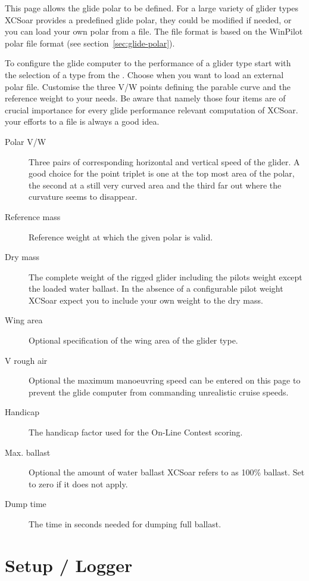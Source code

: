 This page allows the glide polar to be defined. For a large variety of glider types 
XCSoar provides a predefined glide polar, they could be modified if needed, or 
you can load your own polar from a file. 
The file format is based on the WinPilot polar file format (see section~\ref{sec:glide-polar}).

\label{conf:polar} To configure the glide computer to the performance of a glider 
type start with the selection of a type from the . 
Choose  when you want to load an external polar file.
Customise the three V/W points defining the parable curve and the reference 
weight to your needs. 
\tip Be aware that namely those four items are of crucial importance 
for every glide performance relevant computation of XCSoar.   
 your efforts to a file is always a good idea.

\begin{description}
\item[Polar V/W]  Three pairs of corresponding horizontal and vertical speed of the glider. 
  A good choice for the point triplet is one at the top most area of the polar, the second at a 
  still very curved area and the third far out where the curvature seems to disappear.
\item[Reference mass]  Reference weight at which the given polar is valid.
\item[Dry mass]  The complete weight of the rigged glider including the pilots weight except the 
  loaded water ballast. 
  In the absence of a configurable pilot weight XCSoar expect you to include your own weight 
  to the dry mass.
\item[Wing area]  Optional specification of the wing area of the glider type.
\item[V rough air] Optional the maximum manoeuvring speed can 
  be entered on this page to prevent the glide computer from commanding 
  unrealistic cruise speeds.
\item[Handicap]  The handicap factor used for the On-Line Contest scoring.
\item[Max. ballast]  Optional the amount of water ballast XCSoar refers to as 100\% ballast.
  Set to zero if it does not apply.
\item[Dump time]  The time in seconds needed for dumping full ballast.
\end{description}


\section{Setup / Logger} \label{conf:logger}

